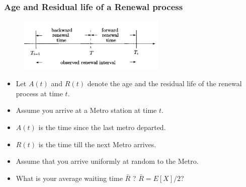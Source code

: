 \documentclass{beamer}
\def \mp {\pause}
\def \mp {}
\newcommand{\ft}[1]{\frametitle{#1}}
\begin{document}
\begin{frame}
 
\begin{figure}[t]


\end{figure}
 
\end{frame}


\begin{frame}
 \ft{Age and Residual life of a Renewal process}\begin{figure}
\includegraphics[width=7cm]{renewal}
\centering
\end{figure}
\begin{itemize}\setlength\itemsep{.8em}
 \item Let $A(t)$ and $R(t)$ denote the age and the residual life of the renewal process at time $t$.
 \mp\item Assume you arrive at a Metro station at time $t$.
 \mp \item $A(t)$ is the time since the last metro departed.
\mp \item $R(t)$ is the time till the next Metro arrives.

\mp \item Assume that you arrive uniformly at random to the Metro. 
\mp \item What is your average waiting time $\bar{R}$ ? $\bar{R} = E[X]/2$?
 \end{itemize}


\end{frame}
\end{document}
